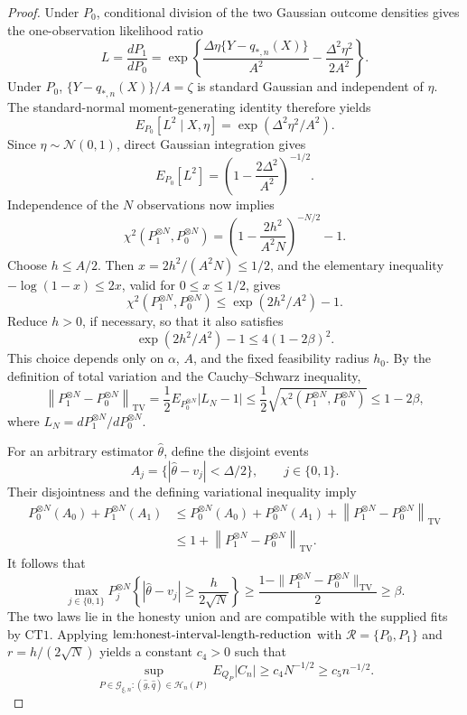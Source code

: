 \documentclass{article}
\begin{document}
\begin{proof}
Under \(P_0\), conditional division of the two Gaussian outcome densities gives the one-observation likelihood ratio
\[
 L=\frac{dP_1}{dP_0}
 =\exp\!\left\{
 \frac{\Delta\eta\{Y-q_{*,n}(X)\}}{A^2}
 -\frac{\Delta^2\eta^2}{2A^2}
 \right\}.
\]
Under \(P_0\), \(\{Y-q_{*,n}(X)\}/A=\zeta\) is standard Gaussian and independent of \(\eta\).  The standard-normal moment-generating identity therefore yields
\[
 E_{P_0}[L^2\mid X,\eta]
 =\exp(\Delta^2\eta^2/A^2).
\]
Since \(\eta\sim\mathcal N(0,1)\), direct Gaussian integration gives
\[
 E_{P_0}[L^2]
 =\left(1-\frac{2\Delta^2}{A^2}\right)^{-1/2}.
\]
Independence of the \(N\) observations now implies
\[
 \chi^2\!\left(P_1^{\otimes N},P_0^{\otimes N}\right)
 =\left(1-\frac{2h^2}{A^2N}\right)^{-N/2}-1.
\]
Choose \(h\le A/2\).  Then \(x=2h^2/(A^2N)\le1/2\), and the elementary inequality \(-\log(1-x)\le2x\), valid for \(0\le x\le1/2\), gives
\[
 \chi^2\!\left(P_1^{\otimes N},P_0^{\otimes N}\right)
 \le \exp(2h^2/A^2)-1.
\]
Reduce \(h>0\), if necessary, so that it also satisfies
\[
 \exp(2h^2/A^2)-1\le4(1-2\beta)^2.
\]
This choice depends only on \(\alpha\), \(A\), and the fixed feasibility radius \(h_0\).  By the definition of total variation and the Cauchy--Schwarz inequality,
\[
 \left\|P_1^{\otimes N}-P_0^{\otimes N}\right\|_{\mathrm{TV}}
 =\frac12E_{P_0^{\otimes N}}|L_N-1|
 \le\frac12\sqrt{\chi^2(P_1^{\otimes N},P_0^{\otimes N})}
 \le1-2\beta,
\]
where \(L_N=dP_1^{\otimes N}/dP_0^{\otimes N}\).

For an arbitrary estimator \(\widehat\theta\), define the disjoint events
\[
 A_j=\{|\widehat\theta-v_j|<\Delta/2\},
 \qquad j\in\{0,1\}.
\]
Their disjointness and the defining variational inequality imply
\[
 \begin{aligned}
 P_0^{\otimes N}(A_0)+P_1^{\otimes N}(A_1)
 &\le P_0^{\otimes N}(A_0)+P_0^{\otimes N}(A_1)
   +\left\|P_1^{\otimes N}-P_0^{\otimes N}\right\|_{\mathrm{TV}}\\
 &\le1+\left\|P_1^{\otimes N}-P_0^{\otimes N}\right\|_{\mathrm{TV}}.
 \end{aligned}
\]
It follows that
\[
 \max_{j\in\{0,1\}}
 P_j^{\otimes N}\!\left\{
 |\widehat\theta-v_j|\ge\frac{h}{2\sqrt N}
 \right\}
 \ge\frac{1-\|P_1^{\otimes N}-P_0^{\otimes N}\|_{\mathrm{TV}}}{2}
 \ge\beta.
\]
The two laws lie in the honesty union and are compatible with the supplied fits by \(\mathrm{CT1}\).  Applying \(\textup{lem:honest-interval-length-reduction}\) with \(\mathscr R=\{P_0,P_1\}\) and \(r=h/(2\sqrt N)\) yields a constant \(c_4>0\) such that
\[
 \sup_{P\in\mathcal G_{\xi,n}:(\widehat g,\widehat q)\in\mathcal H_n(P)}
 E_{Q_P}|C_n|
 \ge c_4N^{-1/2}
 \ge c_5n^{-1/2}.
\]


\end{proof}
\end{document}
